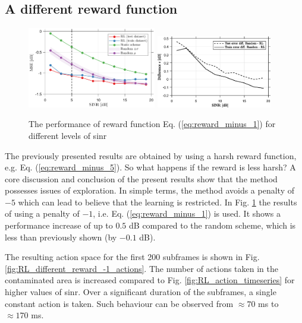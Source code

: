 \subsection{A different reward function}
\begin{figure}
    \centering
    \includegraphics[width=0.5\textwidth]{chapters/part_uplink/figures/results/rewardadjustsment_-1/SINR_sweep.eps}
    \includegraphics[width=0.45\textwidth]{chapters/part_uplink/figures/results/rewardadjustsment_-1/SINR_sweep_diff.eps}
    \caption{The performance of reward function Eq. (\ref{eq:reward_minus_1}) for different levels of \gls{sinr}}
    \label{fig:RL_different_reward_-1}
\end{figure}

\noindent The previously presented results are obtained by using a harsh reward function, e.g. Eq. (\ref{eq:reward_minus_5}). So what happens if the reward is less harsh? A core discussion and conclusion of the present results show that the method possesses issues of exploration. In simple terms, the method avoids a penalty of $-5$ which can lead to believe that the learning is restricted. In Fig. \ref{fig:RL_different_reward_-1} the results of using a penalty of $-1$, i.e. Eq. (\ref{eq:reward_minus_1}) is used. It shows a performance increase of up to $0.5$ dB compared to the random scheme, which is less than previously shown (by $-0.1$ dB).   

The resulting action space for the first 200 subframes is shown in Fig. \ref{fig:RL_different_reward_-1_actions}. The number of actions taken in the contaminated area is increased compared to Fig. \ref{fig:RL_action_timeseries} for higher values of \gls{sinr}. Over a significant duration of the subframes, a single constant action is taken. Such behaviour can be observed from $\approx 70$ ms to $\approx 170$ ms.

